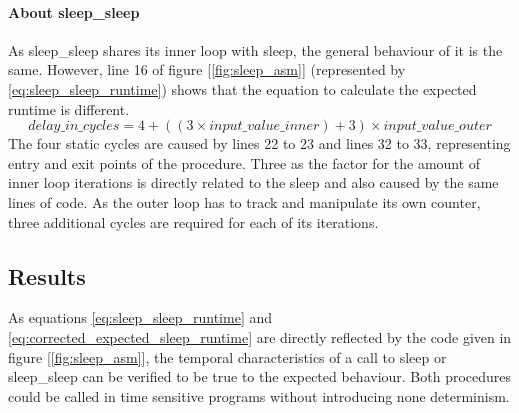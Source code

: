 			\paragraph{About sleep\_sleep} %
			\label{par:about_sleep_sleep}
				As sleep\_sleep shares its inner loop with sleep, the general behaviour of it is the same. However, line 16 of figure [\ref{fig:sleep_asm}] (represented by \ref{eq:sleep_sleep_runtime}) shows that the equation to calculate the expected runtime is different.
				\begin{equation} 
					\label{eq:sleep_sleep_runtime}
					delay\_in\_cycles = 4 + ((3 \times input\_value\_inner) + 3) \times input\_value\_outer
				\end{equation}
				The four static cycles are caused by lines 22 to 23 and lines 32 to 33, representing entry and exit points of the procedure. Three as the factor for the amount of inner loop iterations is directly related to the sleep and also caused by the same lines of code. As the outer loop has to track and manipulate its own counter, three additional cycles are required for each of its iterations.

		\subsection{Results} %
		\label{sub:results}
			As equations \ref{eq:sleep_sleep_runtime} and \ref{eq:corrected_expected_sleep_runtime} are directly reflected by the code given in figure [\ref{fig:sleep_asm}], the temporal characteristics of a call to sleep or sleep\_sleep can be verified to be true to the expected behaviour. Both procedures could be called in time sensitive programs without introducing none determinism.
